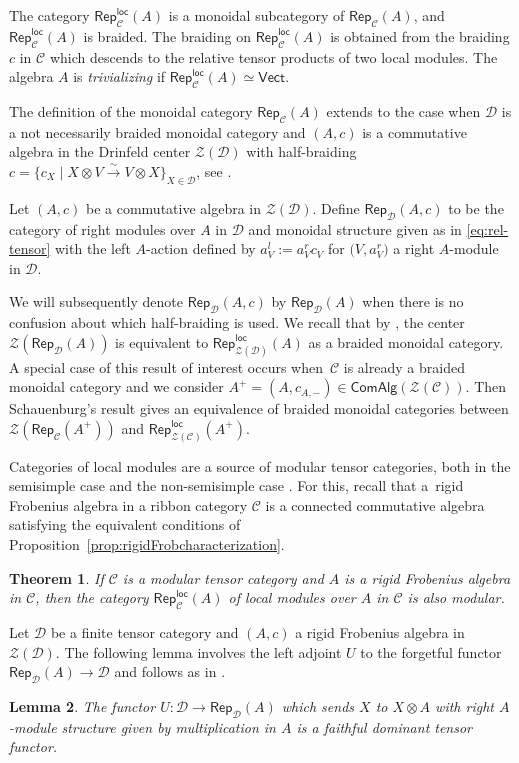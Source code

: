 \documentclass[pdftex]{sigma}
\numberwithin{equation}{section}
\newtheorem{Theorem}{Theorem}[section]
\newtheorem{Lemma}[Theorem]{Lemma}
\newcommand{\isomorph}{\stackrel{\sim}{\to}}
\newcommand{\ComAlg}{\mathsf{ComAlg}}
\newcommand{\Rep}{\mathsf{Rep}}
\newcommand{\locmod}{\mathsf{Rep}^{\mathsf{loc}}}
\newcommand{\Vect}{\mathsf{Vect}}
\newcommand{\cC}{\mathcal{C}}
\newcommand{\cD}{\mathcal{D}}
\newcommand{\cZ}{\mathcal{Z}}
\begin{document}
The category $\locmod_\cC(A)$ is a monoidal subcategory of $\Rep_\cC(A)$,
and $\locmod_\cC(A)$ is braided.
The braiding on $\locmod_\cC(A)$ is obtained from the braiding $c$ in $\cC$ which descends to the relative tensor products of two local modules. The algebra $A$ is \emph{trivializing} if $\locmod_\cC(A)\simeq \Vect$.

The definition of the monoidal category $\Rep_\cC(A)$ extends to the case when $\cD$ is a not necessarily braided monoidal category and $(A,c)$ is a commutative algebra in the Drinfeld center $\cZ(\cD)$ with half-braiding $c=\{c_X\mid X\otimes V\isomorph V\otimes X\}_{X\in \cD}$, see \cite[Section~4]{Sch}.

\begin{Definition}\label{def:RepA-general}
 Let $(A,c)$ be a commutative algebra in $\cZ(\cD)$. Define $\Rep_\cD(A,c)$ to be the category of right modules over $A$ in $\cD$ and monoidal structure given as in \eqref{eq:rel-tensor} with the left $A$-action defined by
 $a_{V}^l:=a_V^r c_V$ for $\big(V,a_V^r\big)$ a right $A$-module in $\cD$.
\end{Definition}
We will subsequently denote $\Rep_\cD(A,c)$ by $\Rep_{\cD}(A)$ when there is no confusion about which half-braiding is used.
We recall that by \cite[Corollary~4.5]{Sch}, the center $\cZ(\Rep_\cD(A))$ is equivalent to $\locmod_{\cZ(\cD)}(A)$ as a braided monoidal category. A special case of this result of interest occurs when~$\cC$ is already a braided monoidal category and we consider ${A^+=(A,c_{A,-})\in \ComAlg(\cZ(\cC))}$. Then Schauenburg's result gives an equivalence of braided monoidal categories between $\cZ(\Rep_\cC(A^+))$ and $\locmod_{\cZ(\cC)}(A^+)$.

Categories of local modules are a source of modular tensor categories, both in the semisimple case \cite[Theorem~4.5]{KO} and the non-semisimple case \cite[Theorem~4.12]{LW3}. For this, recall that a~rigid Frobenius algebra in a ribbon category $\cC$ is a connected commutative algebra satisfying the equivalent conditions of Proposition~\ref{prop:rigidFrobcharacterization}.

\begin{Theorem}\label{thm:locmodular}
If $\cC$ is a modular tensor category and $A$ is a rigid Frobenius algebra in $\cC$, then the category $\locmod_\cC(A)$ of local modules over $A$ in $\cC$ is also modular.
\end{Theorem}


Let $\cD$ be a finite tensor category and $(A,c)$ a rigid Frobenius algebra in $\cZ(\cD)$. The following lemma involves the left adjoint $U$ to the forgetful functor $\Rep_{\cD}(A)\to \cD$ and follows as in \cite[Lemma~4.5]{LW3}.
\begin{Lemma}\label{lem:U}
 The functor $U\colon \cD\to \Rep_\cD(A)$ which sends $X$ to $X\otimes A$ with right $A$-module structure given by multiplication in $A$ is a faithful dominant tensor functor.
\end{Lemma}
\end{document}
